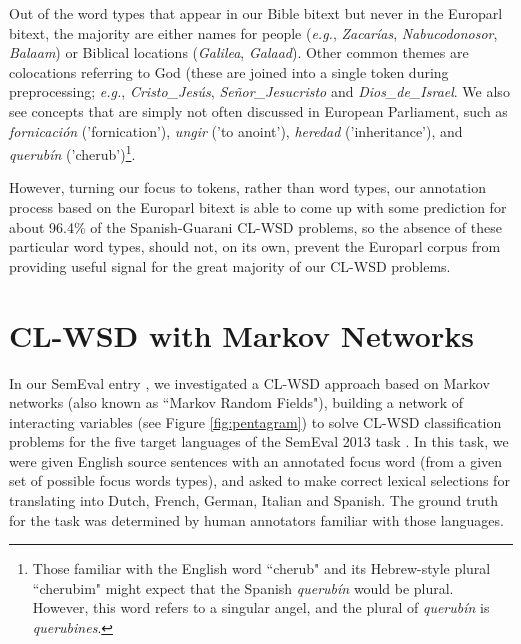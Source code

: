 Out of the word types that appear in our Bible bitext but never in the Europarl
bitext, the majority are either names for people (\emph{e.g.}, \emph{Zacarías},
\emph{Nabucodonosor}, \emph{Balaam}) or Biblical locations (\emph{Galilea},
\emph{Galaad}). Other common themes are colocations referring to God (these are
joined into a single token during preprocessing; \emph{e.g.},
\emph{Cristo\_Jesús}, \emph{Señor\_Jesucristo} and \emph{Dios\_de\_Israel}. We
also see concepts that are simply not often discussed in European Parliament,
such as \emph{fornicación} ('fornication'), \emph{ungir} ('to anoint'),
\emph{heredad} ('inheritance'), and \emph{querubín} ('cherub')\footnote{Those
familiar with the English word ``cherub" and its Hebrew-style plural
``cherubim" might expect that the Spanish \emph{querubín} would be plural.
However, this word refers to a singular angel, and the plural of
\emph{querubín} is \emph{querubines}.}.

However, turning our focus to tokens, rather than word types, our annotation
process based on the Europarl bitext is able to come up with some prediction
for about 96.4\% of the Spanish-Guarani CL-WSD problems, so the absence of
these particular word types, should not, on its own, prevent the Europarl
corpus from providing useful signal for the great majority of our CL-WSD
problems.




\section{CL-WSD with Markov Networks}
\label{sec:multilingual-mrf}
In our SemEval entry \cite{rudnick-liu-gasser:2013:SemEval-2013}, we
investigated a CL-WSD approach based on Markov networks (also known as ``Markov
Random Fields"), building a network of interacting variables (see Figure
\ref{fig:pentagram}) to solve CL-WSD classification problems for the five
target languages of the SemEval 2013 task \cite{task10}. In this task, we were
given English source sentences with an annotated focus word (from a given set
of possible focus words types), and asked to make correct lexical selections
for translating into Dutch, French, German, Italian and Spanish. The ground
truth for the task was determined by human annotators familiar with those
languages.

